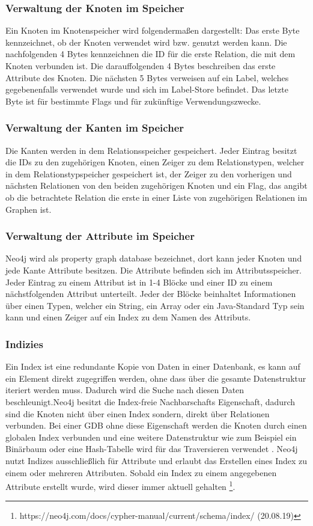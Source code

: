 \subsubsection{Verwaltung der Knoten im Speicher}
Ein Knoten im Knotenspeicher wird folgendermaßen dargestellt: Das erste Byte kennzeichnet, ob der Knoten verwendet wird bzw. genutzt werden kann. Die nachfolgenden 4 Bytes kennzeichnen die ID für die erste Relation, die mit dem Knoten verbunden ist. Die darauffolgenden 4 Bytes beschreiben das erste Attribute des Knoten. Die nächsten 5 Bytes verweisen auf ein Label, welches gegebenenfalls verwendet wurde und sich im Label-Store befindet. Das letzte Byte ist für bestimmte Flags und für zukünftige Verwendungszwecke. 
\subsubsection{Verwaltung der Kanten im Speicher}
Die Kanten werden in dem Relationsspeicher gespeichert. Jeder Eintrag besitzt die IDs zu den zugehörigen Knoten, einen Zeiger zu dem Relationstypen, welcher in dem Relationstypspeicher gespeichert ist, der Zeiger zu den vorherigen und nächsten Relationen von den beiden zugehörigen Knoten und ein Flag, das angibt ob die betrachtete Relation die erste in einer Liste von zugehörigen Relationen im Graphen ist. 
\subsubsection{Verwaltung der Attribute im Speicher}
Neo4j wird als property graph database bezeichnet, dort kann jeder Knoten und jede Kante Attribute besitzen. Die Attribute befinden sich im Attributsspeicher. Jeder Eintrag zu einem Attribut ist in 1-4 Blöcke und einer ID zu einem nächstfolgenden Attribut unterteilt. Jeder der Blöcke beinhaltet Informationen über einen Typen, welcher ein String, ein Array oder ein Java-Standard Typ sein kann und einen Zeiger auf ein Index zu dem Namen des Attributs.  
\subsubsection{Indizies}
Ein Index ist eine redundante Kopie von Daten in einer Datenbank, es kann auf ein Element direkt zugegriffen werden, ohne dass über die gesamte Datenstruktur iteriert werden muss. Dadurch wird die Suche nach diesen Daten beschleunigt.Neo4j besitzt die Index-freie Nachbarschafts Eigenschaft, dadurch sind die Knoten nicht über einen Index  sondern, direkt über Relationen verbunden. Bei einer GDB ohne diese Eigenschaft werden die Knoten durch einen globalen Index verbunden und eine weitere Datenstruktur wie zum Beispiel ein Binärbaum oder eine Hash-Tabelle wird für das Traversieren verwendet \parencite{robinson2013graph}. \newline
Neo4j nutzt Indizes ausschließlich für Attribute und erlaubt das Erstellen eines Index zu einem oder mehreren Attributen. Sobald ein Index zu einem angegebenen Attribute erstellt wurde, wird dieser immer aktuell gehalten \footnote{https://neo4j.com/docs/cypher-manual/current/schema/index/ (20.08.19)}.  	

